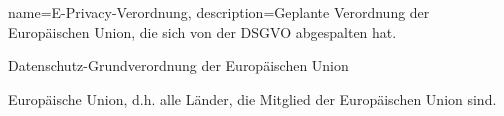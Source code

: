 {
    name={E-Privacy-Verordnung},
    description={Geplante Verordnung der Europäischen Union, die sich von der DSGVO abgespalten hat.}
}

{
    Datenschutz-Grundverordnung der Europäischen Union
}

{  
    Europäische Union, d.h. alle Länder, die Mitglied der Europäischen Union sind.
}